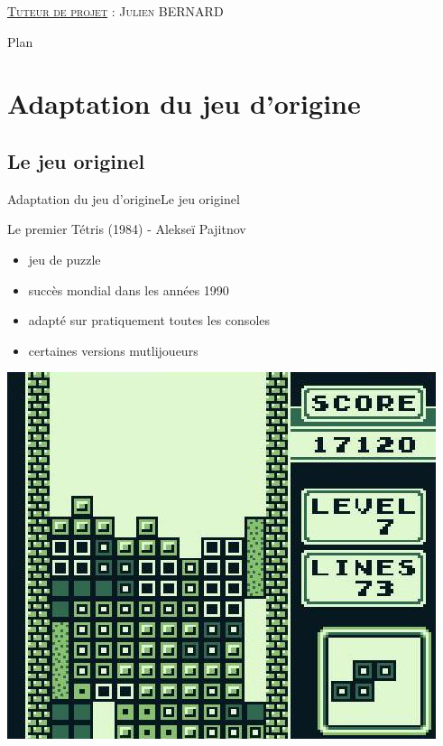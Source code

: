 \documentclass[french]{beamer}
\begin{document}
\begin{frame}
	\vspace{-0.20cm}
	

	\vspace{0.20cm}

	\textsc{\underline{Tuteur de projet} : Julien BERNARD}

\hspace{2cm}

\end{frame}

\begin{frame}{Plan}

	\tableofcontents

\end{frame}


\section{Adaptation du jeu d'origine}
	\subsection{Le jeu originel}

\begin{frame}{Adaptation du jeu d'origine}{Le jeu originel}

	\begin{block}{Le premier Tétris (1984) - Alekseï Pajitnov}
		\begin{itemize}
			\item jeu de puzzle
			\item succès mondial dans les années 1990
			\item adapté sur pratiquement toutes les consoles
			\item certaines versions mutlijoueurs
		\end{itemize}

	\end{block}

	\begin{center}
		\includegraphics[scale=0.25]{img/Tetris8.jpg}
	\end{center}
\end{frame}
\end{document}
